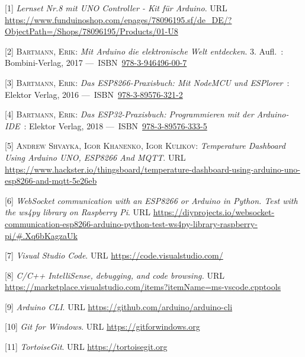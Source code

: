 \documentclass[
  ngerman,
  a4paper,
  12pt]{scrartcl}
\newlength{\cslhangindent}
\newenvironment{cslreferences}%
  {\setlength{\parindent}{0pt}%
  \everypar{\setlength{\hangindent}{\cslhangindent}}\ignorespaces}%
  {\par}
\begin{document}
\hypertarget{refs}{}
\begin{cslreferences}
\leavevmode\hypertarget{ref-lernset}{}%
{[}1{]} \emph{Lernset Nr.8 mit UNO Controller - Kit für Arduino}. URL
\url{https://www.funduinoshop.com/epages/78096195.sf/de_DE/?ObjectPath=/Shops/78096195/Products/01-U8}

\leavevmode\hypertarget{ref-bartmannArduino}{}%
{[}2{]} \textsc{Bartmann, Erik}: \emph{Mit Arduino die elektronische
Welt entdecken}. 3. Aufl.~: Bombini-Verlag, 2017
---~ISBN~\href{https://worldcat.org/isbn/978-3-946496-00-7}{978-3-946496-00-7}

\leavevmode\hypertarget{ref-bartmannESP8266}{}%
{[}3{]} \textsc{Bartmann, Erik}: \emph{Das ESP8266-Praxisbuch: Mit
NodeMCU und ESPlorer}~: Elektor Verlag, 2016
---~ISBN~\href{https://worldcat.org/isbn/978-3-89576-321-2}{978-3-89576-321-2}

\leavevmode\hypertarget{ref-bartmannESP32}{}%
{[}4{]} \textsc{Bartmann, Erik}: \emph{Das ESP32-Praxisbuch:
Programmieren mit der Arduino-IDE}~: Elektor Verlag, 2018
---~ISBN~\href{https://worldcat.org/isbn/978-3-89576-333-5}{978-3-89576-333-5}

\leavevmode\hypertarget{ref-temperatureDashboard}{}%
{[}5{]} \textsc{Andrew Shvayka, Igor Khanenko, \textnormal{Igor
Kulikov}}: \emph{Temperature Dashboard Using Arduino UNO, ESP8266 And
MQTT}. URL
\url{https://www.hackster.io/thingsboard/temperature-dashboard-using-arduino-uno-esp8266-and-mqtt-5e26eb}

\leavevmode\hypertarget{ref-websocketcommunication}{}%
{[}6{]} \emph{WebSocket communication with an ESP8266 or Arduino in
Python. Test with the ws4py library on Raspberry Pi}. URL
\url{https://diyprojects.io/websocket-communication-esp8266-arduino-python-test-ws4py-library-raspberry-pi/\#.Xq6bKagzaUk}

\leavevmode\hypertarget{ref-vscode}{}%
{[}7{]} \emph{Visual Studio Code}. URL
\url{https://code.visualstudio.com/}

\leavevmode\hypertarget{ref-intellisense}{}%
{[}8{]} \emph{C/C++ IntelliSense, debugging, and code browsing.} URL
\url{https://marketplace.visualstudio.com/items?itemName=ms-vscode.cpptools}

\leavevmode\hypertarget{ref-arduinoCli}{}%
{[}9{]} \emph{Arduino CLI}. URL
\url{https://github.com/arduino/arduino-cli}

\leavevmode\hypertarget{ref-gitForWindows}{}%
{[}10{]} \emph{Git for Windows}. URL \url{https://gitforwindows.org}

\leavevmode\hypertarget{ref-tortoiseGit}{}%
{[}11{]} \emph{TortoiseGit}. URL \url{https://tortoisegit.org}


\end{cslreferences}
\end{document}
